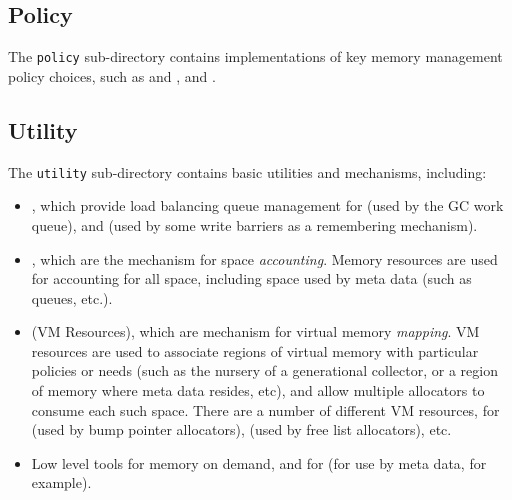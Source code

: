 \subsection{Policy} \label{sssec:policy}

The \texttt{policy} sub-directory contains implementations of key
memory management policy choices, such as  and ,  and .

\subsection{Utility} \label{sssec:utility}

The \texttt{utility} sub-directory contains basic utilities and
mechanisms, including:
\begin{itemize}
\item {}, which provide load balancing queue
  management for  (used by
  the GC work queue), and  (used by some write barriers as a
  remembering mechanism).
\item {}, which are the
  mechanism for space \emph{accounting}.  Memory resources are used
  for accounting for all space, including space used by meta data
  (such as queues, etc.).
\item {} (VM
  Resources), which are mechanism for virtual memory \emph{mapping}.
  VM resources are used to associate regions of virtual memory with
  particular policies or needs (such as the nursery of a generational
  collector, or a region of memory where meta data resides, etc), and
  allow multiple allocators to consume each such space. There are a
  number of different VM resources, for  (used by bump pointer
  allocators), 
  (used by free list allocators), etc.
\item Low level tools for 
  memory on demand, and for  (for use by meta data, for example).
\end{itemize}

